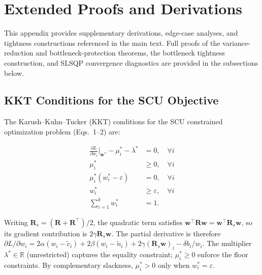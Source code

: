 \documentclass[a4paper,fleqn]{cas-sc}
\begin{document}
\appendix
\makeatletter
\renewcommand{\thetable}{\@Alph\c@section.\arabic{table}}
\renewcommand{\thefigure}{\@Alph\c@section.\arabic{figure}}
\renewcommand{\thealgorithm}{\@Alph\c@section.\arabic{algorithm}}
\renewcommand{\theequation}{\@Alph\c@section.\arabic{equation}}
\makeatother

\section{Extended Proofs and Derivations}
\label{app:proofs}

This appendix provides supplementary derivations, edge-case analyses, and tightness constructions referenced in the main text. Full proofs of the variance-reduction and bottleneck-protection theorems, the bottleneck tightness construction, and SLSQP convergence diagnostics are provided in the subsections below.

\subsection{KKT Conditions for the SCU Objective}
\label{app:kkt}

The Karush--Kuhn--Tucker (KKT) conditions for the SCU constrained optimization problem (Eqs.~1--2) are:

\begin{align}
\frac{\partial L}{\partial w_i}\bigg|_{\mathbf{w}^*} - \mu_i^* - \lambda^* &= 0, \quad \forall i \\
\mu_i^* &\ge 0, \quad \forall i \\
\mu_i^*(w_i^* - \varepsilon) &= 0, \quad \forall i \\
w_i^* &\ge \varepsilon, \quad \forall i \\
\sum_{i=1}^k w_i^* &= 1.
\end{align}

Writing $\mathbf{R}_{s}=(\mathbf{R}+\mathbf{R}^{\top})/2$, the quadratic term satisfies $\mathbf{w}^{\top}\mathbf{R}\mathbf{w}=\mathbf{w}^{\top}\mathbf{R}_{s}\mathbf{w}$, so its gradient contribution is $2\gamma\mathbf{R}_{s}\mathbf{w}$. The partial derivative is therefore $\partial L / \partial w_i = 2\alpha(w_i - \tilde{c}_i) + 2\beta(w_i - \tilde{n}_i) + 2\gamma(\mathbf{R}_{s}\mathbf{w})_i - \delta b_i / w_i$. The multiplier $\lambda^* \in \mathbb{R}$ (unrestricted) captures the equality constraint; $\mu_i^* \ge 0$ enforce the floor constraints. By complementary slackness, $\mu_i^* > 0$ only when $w_i^* = \varepsilon$.
\end{document}
